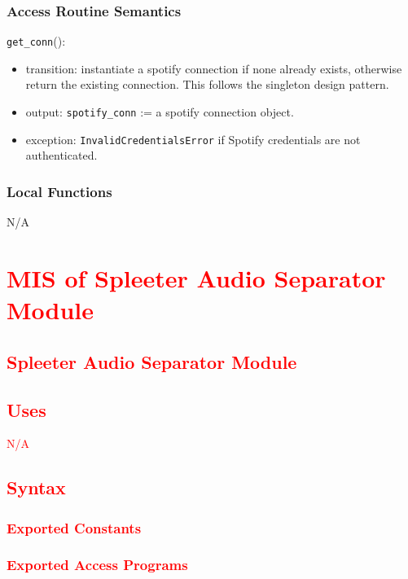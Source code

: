 \documentclass[12pt, titlepage]{article}
\begin{document}
\subsubsection{Access Routine Semantics}

\noindent \texttt{get\_conn}():
\begin{itemize}
  \item transition: instantiate a spotify connection if none already exists, otherwise return the existing connection. This follows the singleton design pattern.
  \item output: \texttt{spotify\_conn} := a spotify connection object.
\item exception: \texttt{InvalidCredentialsError} if Spotify credentials are not authenticated.
\end{itemize}

\subsubsection{Local Functions}
N/A

\section{\textcolor{red}{MIS of Spleeter Audio Separator Module}} 

\subsection{\textcolor{red}{Spleeter Audio Separator Module}}

\subsection{\textcolor{red}{Uses}}
\textcolor{red}{N/A}

\subsection{\textcolor{red}{Syntax}}

\subsubsection{\textcolor{red}{Exported Constants}}

\subsubsection{\textcolor{red}{Exported Access Programs}}
\end{document}
